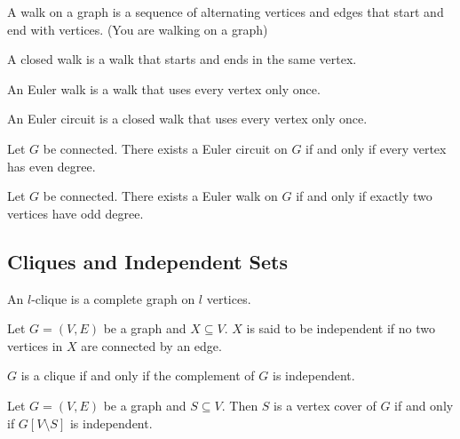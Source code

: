 \documentclass[a4paper]{article}
\begin{document}
\begin{defn}[Walk] A walk on a graph is a sequence of alternating vertices and edges that start and end with vertices. (You are walking on a graph)
\end{defn}

\begin{defn} A closed walk is a walk that starts and ends in the same vertex. 
\end{defn}

\begin{defn} An Euler walk is a walk that uses every vertex only once. 
\end{defn}

\begin{defn} An Euler circuit is a closed walk that uses every vertex only once. 
\end{defn}

\begin{thm} Let $G$ be connected. There exists a Euler circuit on $G$ if and only if every vertex has even degree. 
\end{thm}

\begin{thm} Let $G$ be connected. There exists a Euler walk on $G$ if and only if exactly two vertices have odd degree. 
\end{thm}

\subsection{Cliques and Independent Sets}
\begin{defn}[Cliques] An $l$-clique is a complete graph on $l$ vertices. 
\end{defn}

\begin{defn} Let $G=(V,E)$ be a graph and $X\subseteq V$. $X$ is said to be independent if no two vertices in $X$ are connected by an edge. 
\end{defn}

\begin{prp} $G$ is a clique if and only if the complement of $G$ is independent. 
\end{prp}

\begin{prp} Let $G=(V,E)$ be a graph and $S\subseteq V$. Then $S$ is a vertex cover of $G$ if and only if $G[V\setminus S]$ is independent. 
\end{prp}
\end{document}
